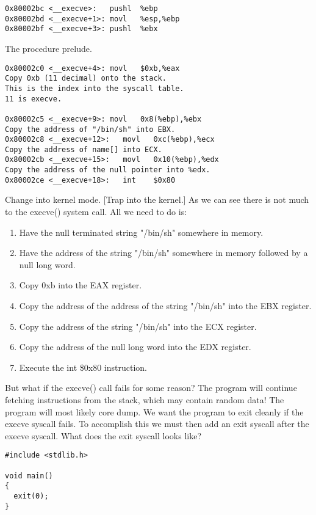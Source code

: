 \documentclass[12pt]{article}
\begin{document}
\begin{verbatim}
0x80002bc <__execve>:   pushl  %ebp
0x80002bd <__execve+1>: movl   %esp,%ebp
0x80002bf <__execve+3>: pushl  %ebx
\end{verbatim}
The procedure prelude. 
\begin{verbatim}
0x80002c0 <__execve+4>: movl   $0xb,%eax
Copy 0xb (11 decimal) onto the stack. 
This is the index into the syscall table. 
11 is execve. 

0x80002c5 <__execve+9>: movl   0x8(%ebp),%ebx
Copy the address of "/bin/sh" into EBX. 
0x80002c8 <__execve+12>:   movl   0xc(%ebp),%ecx
Copy the address of name[] into ECX. 
0x80002cb <__execve+15>:   movl   0x10(%ebp),%edx
Copy the address of the null pointer into %edx. 
0x80002ce <__execve+18>:   int    $0x80
\end{verbatim}
Change into kernel mode. [Trap into the kernel.] 
As we can see there is not much to the execve() system call. All we need to do is: 
\begin{enumerate}
\item Have the null terminated string "/bin/sh" somewhere in memory. 
\item Have the address of the string "/bin/sh" somewhere in memory followed by a null long word. 
\item Copy 0xb into the EAX register. 
\item Copy the address of the address of the string "/bin/sh" into the EBX register. 
\item Copy the address of the string "/bin/sh" into the ECX register. 
\item Copy the address of the null long word into the EDX register. 
\item Execute the int \$0x80 instruction. 
\end{enumerate}


But what if the execve() call fails for some reason? The program will continue fetching instructions from the 
stack, which may contain random data! The program will most likely core dump. We want the program to exit 
cleanly if the execve syscall fails. To accomplish this we must then add an exit syscall after the execve syscall. 
What does  the exit syscall looks like?


\begin{lstlisting}[caption=exit.c]
#include <stdlib.h>

void main() 
{
  exit(0);
}
\end{lstlisting}
\end{document}
